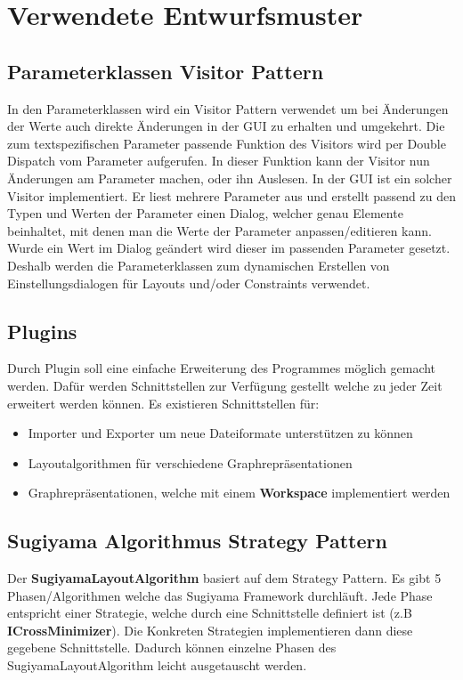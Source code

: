 \chapter{Verwendete Entwurfsmuster}
\label{ch:entwurfsmuster}

\section{Parameterklassen Visitor Pattern}
In den Parameterklassen wird ein Visitor Pattern verwendet um bei Änderungen der Werte auch direkte Änderungen in der GUI zu erhalten und umgekehrt. Die zum textspezifischen Parameter passende Funktion des Visitors wird per Double Dispatch vom Parameter aufgerufen. In dieser Funktion kann der Visitor nun Änderungen am Parameter machen, oder ihn Auslesen. In der GUI ist ein solcher Visitor implementiert. Er liest mehrere Parameter aus und erstellt passend zu den Typen und Werten der Parameter einen Dialog, welcher genau Elemente beinhaltet, mit denen man die Werte der Parameter anpassen/editieren kann. Wurde ein Wert im Dialog geändert wird dieser im passenden Parameter gesetzt. Deshalb werden die Parameterklassen zum dynamischen Erstellen von Einstellungsdialogen für Layouts und/oder Constraints verwendet.

\section{Plugins}
Durch Plugin soll eine einfache Erweiterung des Programmes möglich gemacht werden. Dafür werden Schnittstellen zur Verfügung gestellt welche zu jeder Zeit erweitert werden können.
Es existieren Schnittstellen für:
\begin{itemize}
  \item Importer und Exporter um neue Dateiformate unterstützen zu können
  \item Layoutalgorithmen für verschiedene Graphrepräsentationen
  \item Graphrepräsentationen, welche mit einem \textbf{Workspace} implementiert werden
\end{itemize}

\section{Sugiyama Algorithmus Strategy Pattern}
Der \textbf{SugiyamaLayoutAlgorithm} basiert auf dem Strategy Pattern. Es gibt 5 Phasen/Algorithmen welche das Sugiyama Framework durchläuft.
Jede Phase entspricht einer Strategie, welche durch eine Schnittstelle definiert ist (z.B \textbf{ICrossMinimizer}).
Die Konkreten Strategien implementieren dann diese gegebene Schnittstelle. Dadurch können einzelne Phasen des SugiyamaLayoutAlgorithm leicht ausgetauscht werden.

